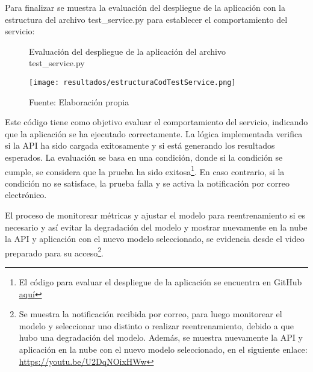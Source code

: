 \newpage

Para finalizar se muestra la evaluación del despliegue de la aplicación con la estructura del archivo test\_service.py para establecer el comportamiento del servicio:

\begin{figure}[h]
	\centering
	\caption{Evaluación del despliegue de la aplicación del archivo test\_service.py}
	\texttt{[image: resultados/estructuraCodTestService.png]}
	\caption*{\footnotesize Fuente: Elaboración propia}
	\label{fig:figuraEstructuraCodTestService}
\end{figure}

Este código tiene como objetivo evaluar el comportamiento del servicio, indicando que la aplicación se ha ejecutado correctamente. La lógica implementada verifica si la API ha sido cargada exitosamente y si está generando los resultados esperados. La evaluación se basa en una condición, donde si la condición se cumple, se considera que la prueba ha sido exitosa\footnote{El código para evaluar el despliegue de la aplicación se encuentra en GitHub \href{https://github.com/juferoto/mlops_project/tree/master/application/tests}{aquí}}. En caso contrario, si la condición no se satisface, la prueba falla y se activa la notificación por correo electrónico.

El proceso de monitorear métricas y ajustar el modelo para reentrenamiento si es necesario y así evitar la degradación del modelo y mostrar nuevamente en la nube la API y aplicación con el nuevo modelo seleccionado, se evidencia desde el video preparado para su acceso\footnote{Se muestra la notificación recibida por correo, para luego monitorear el modelo y seleccionar uno distinto o realizar reentrenamiento, debido a que hubo una degradación del modelo. Además, se muestra nuevamente la API y aplicación en la nube con el nuevo modelo seleccionado, en el siguiente enlace: \href{https://youtu.be/U2DqNOixHWw}{https://youtu.be/U2DqNOixHWw}}.

